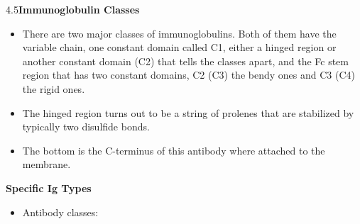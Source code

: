 \documentclass[UTF8]{book}
\begin{document}
4.5\quad \textbf{Immunoglobulin Classes}
\begin{itemize}
\item There are two major classes of immunoglobulins. Both of them have the variable chain, one constant domain called C1, either a hinged region or another constant domain (C2) that tells the classes apart, and the Fc stem region that has two constant domains, C2 (C3) the bendy ones and C3 (C4) the rigid ones.
\item The hinged region turns out to be a string of prolenes that are stabilized by typically two disulfide bonds.
\item The bottom is the C-terminus of this antibody where attached to the membrane.
\end{itemize}
\newpage
{}\quad \textbf{Specific Ig Types}
\begin{itemize}
\item Antibody classes:


\end{itemize}
\end{document}

